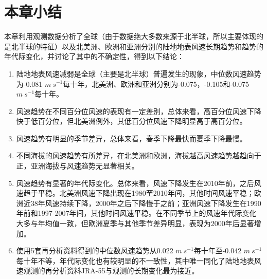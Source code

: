 \section{本章小结}

本章利用观测数据分析了全球（由于数据绝大多数来源于北半球，所以主要体现的是北半球的特征）以及北美洲、欧洲和亚洲分别的陆地地表风速长期趋势和趋势的年代际变化，并讨论了其中的不确定性，得到以下结论：

\begin{enumerate}

\item 陆地地表风速减弱是全球（主要是北半球）普遍发生的现象，中位数风速趋势为-0.081 $m ~ s^{-1}$每十年，北美洲、欧洲和亚洲分别为-0.075，-0.105和-0.075 $m ~ s^{-1}$每十年。

\item 风速趋势在不同百分位风速的表现有一定差别，总体来看，高百分位风速下降快于低百分位，但北美洲例外，其低百分位风速下降明显高于高百分位。

\item 风速趋势有明显的季节差异，总体来看，春季下降最快而夏季下降最慢。

\item 不同海拔的风速趋势有所差异，在北美洲和欧洲，海拔越高风速趋势越趋向于正，亚洲海拔与风速趋势无显著相关。

\item 风速趋势有显著的年代际变化。总体来看，风速下降发生在2010年前，之后风速趋于平稳。北美洲风速下降出现在1980至2010年间，其他时间风速平稳；欧洲近38年风速持续下降，2000年之后下降慢于之前；亚洲风速下降发生在1990年前和1997-2007年间，其他时间风速平稳。在不同季节上的风速年代际变化大多与年均值一致，但欧洲夏季与其他季节差异明显，表现为2000年后显著增加。

\item 使用5套再分析资料得到的中位数风速趋势从0.022 $m ~ s^{-1}$每十年至-0.042 $m ~ s^{-1}$每十年不等，年代际变化也有较明显的不一致性，其中唯一同化了陆地地表风速观测的再分析资料JRA-55与观测的长期变化最为接近。
\end{enumerate}
